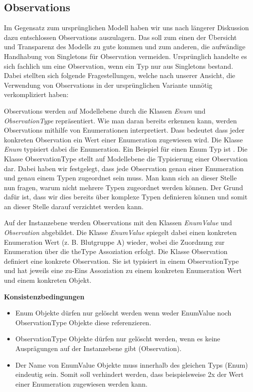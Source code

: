 \subsection{Observations}\label{Observations}
Im Gegensatz zum ursprünglichen Modell haben wir uns nach längerer Diskussion dazu entschlossen Observations auszulagern. 
Das soll zum einen der Übersicht und Transparenz des Modells zu gute kommen und zum anderen, 
die aufwändige Handhabung von Singletons für Observation vermeiden. 
Ursprünglich handelte es sich fachlich um eine Observation, wenn ein Typ nur aus Singletons bestand. 
Dabei stellten sich folgende Fragestellungen, welche nach unserer Ansicht, 
die Verwendung von Observations in der ursprünglichen Variante unnötig verkompliziert haben:


Observations werden auf Modellebene durch die Klassen \emph{Enum} und \emph{ObservationType} repräsentiert. 
Wie man daran bereits erkennen kann, werden Observations mithilfe von Enumerationen interpretiert. 
Dass bedeutet dass jeder konkreten Observation ein Wert einer Enumeration zugewiesen wird. 
Die Klasse \emph{Enum} typisiert dabei die Enumeration. 
Ein Beispiel für einen Enum Typ ist . Die Klasse ObservationType stellt auf Modellebene die 
Typisierung einer Observation dar. Dabei haben wir festgelegt, dass jede Observation genau einer Enumeration 
und genau einem Typen zugeordnet sein muss. Man kann sich an dieser Stelle nun fragen, warum nicht mehrere Typen 
zugeordnet werden können. Der Grund dafür ist, dass wir dies bereits über komplexe Typen definieren können und somit 
an dieser Stelle darauf verzichtet werden kann.

Auf der Instanzebene werden Observations mit den Klassen \emph{EnumValue} und \emph{Observation} abgebildet. 
Die Klasse \emph{EnumValue} spiegelt dabei einen konkreten Enumeration Wert (z. B. Blutgruppe A) wieder, 
wobei die Zuordnung zur Enumeration über die theType Assoziation erfolgt. 
Die Klasse Observation definiert eine konkrete Observation. 
Sie ist typisiert in einem ObservationType und hat jeweils eine zu-Eins Assoziation zu einem konkreten Enumeration Wert 
und einem konkreten Objekt.

\textbf{Konsistenzbedingungen} \newline
\begin{itemize}
  \item Enum Objekte dürfen nur gelöscht werden wenn weder EnumValue noch ObservationType Objekte diese referenzieren.
  \item ObservationType Objekte dürfen nur gelöscht werden, wenn es keine Ausprägungen auf der Instanzebene gibt (Observation).
  \item Der Name von EnumValue Objekte muss innerhalb des gleichen Typs (Enum) eindeutig sein. Somit soll verhindert werden, dass beispielsweise 2x der Wert  einer Enumeration  zugewiesen werden kann.
\end{itemize}


